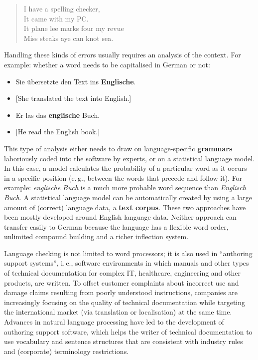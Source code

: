 \begin{multicols}{2}
\begin{quote}
  I have a spelling checker,\\
  It came with my PC.\\
  It plane lee marks four my revue\\
  Miss steaks aye can knot sea.
\end{quote}

Handling these kinds of errors usually requires an analysis of the context. For example: whether a word needs to be capitalised in German or not:

\begin{itemize}
\item Sie übersetzte den Text ins \textbf{Englische}.
\item {[}She translated the text into English.{]} 
\item Er las das \textbf{englische} Buch.
\item {[}He read the English book.{]}
\end{itemize}

This type of analysis either needs to draw on language-specific \textbf{grammars} laboriously coded into the software by experts, or on a statistical language model. In this case, a model calculates the probability of a particular word as it occurs in a specific position (e.\,g., between the words that precede and follow it). For example: \textit{englische Buch} is a much more probable word sequence than \textit{Englisch Buch}. A statistical language model can be automatically created by using a large amount of (correct) language data, a \textbf{text corpus}. These two approaches have been mostly developed around English language data. Neither approach can transfer easily to German because the language has a flexible word order, unlimited compound building and a richer inflection system.

Language checking is not limited to word processors; it is also used in “authoring support systems”, i.\,e., software environments in which manuals and other types of technical documentation for complex IT, healthcare, engineering and other products, are written. To offset customer complaints about incorrect use and damage claims resulting from poorly understood instructions, companies are increasingly focusing on the quality of technical documentation while targeting the international market (via translation or localisation) at the same time. Advances in natural language processing have led to the development of authoring support software, which helps the writer of technical documentation to use vocabulary and sentence structures that are consistent with industry rules and (corporate) terminology restrictions.


\end{multicols}
